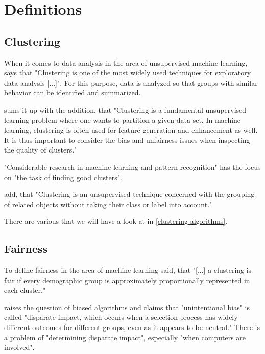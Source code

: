 \section{Definitions}


\subsection{Clustering}

When it comes to data analysis in the area of unsupervised machine learning, \textcite[1]{VonLuxburg2007} says that "Clustering is one of the most widely used techniques for exploratory data analysis [...]". For this purpose, data is analyzed so that groups with similar behavior can be identified and summarized.

\textcite[1]{Bera2019} sums it up with the addition, that "Clustering is a fundamental unsupervised learning problem where one wants to partition a given data-set. In machine learning, clustering is often used for feature generation and enhancement as well. It is thus important to consider the bias and unfairness issues when inspecting the quality of clusters."

"Considerable research in machine learning and pattern recognition" has the focus on "the task of finding good clusters". \autocite[1]{Ng2001}

\textcite[1]{Nascimento2011} add, that "Clustering is an unsupervised technique concerned with the grouping of related objects without taking their class or label into account."

There are various  that we will have a look at in \autoref{clustering-algorithms}.


\subsection{Fairness}

To define fairness in the area of machine learning \textcite[1]{Kleindessner2019} said, that "[...] a clustering is fair if every demographic group is approximately proportionally represented in each cluster."

\textcite[1]{Feldman2014CertifyingImpact} raises the question of biased algorithms and claims that "unintentional bias" is called "disparate impact, which occurs when a selection process has widely different outcomes for different groups, even as it appears to be neutral." There is a problem of "determining disparate impact", especially "when computers are involved".

